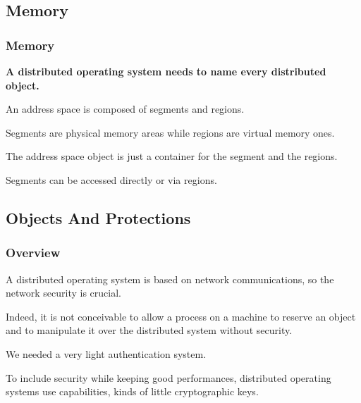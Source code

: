 %
%

\subsection{Memory}


\begin{frame}
  \frametitle{Memory}

  \textbf{A distributed operating system needs to name every
    distributed object.}

  \nl

  An address space is composed of segments and regions.

  \nl

  Segments are physical memory areas while regions are virtual memory
  ones.

  \nl

  The address space object is just a container for the segment and
  the regions.

  \nl

  Segments can be accessed directly or via regions.
\end{frame}

%
%

\subsection{Objects And Protections}


\begin{frame}
  \frametitle{Overview}

  A distributed operating system is based on network communications, so
  the network security is crucial.

  \nl

  Indeed, it is not conceivable to allow a process on a machine
  to reserve an object and to manipulate it over the distributed
  system without security.

  \nl

  We needed a very light authentication system.

  \nl

  To include security while keeping good performances, distributed
  operating systems use capabilities, kinds of little cryptographic keys.
\end{frame}


